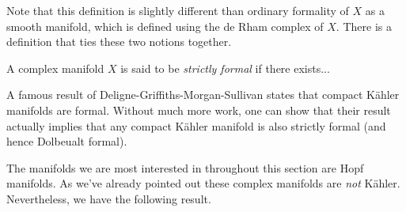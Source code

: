 \documentclass[10pt]{amsart}
\begin{document}
Note that this definition is slightly different than ordinary formality of $X$ as a smooth manifold, which is defined using the de Rham complex of $X$.
There is a definition that ties these two notions together. 

\begin{dfn}
A complex manifold $X$ is said to be {\em strictly formal} if there exists...
\end{dfn}

A famous result of Deligne-Griffiths-Morgan-Sullivan states that compact K\"{a}hler manifolds are formal. 
Without much more work, one can show that their result actually implies that any compact K\"{a}hler manifold is also strictly formal (and hence Dolbeualt formal).

The manifolds we are most interested in throughout this section are Hopf manifolds.
As we've already pointed out these complex manifolds are {\em not} K\"{a}hler.
Nevertheless, we have the following result. 
\end{document}
